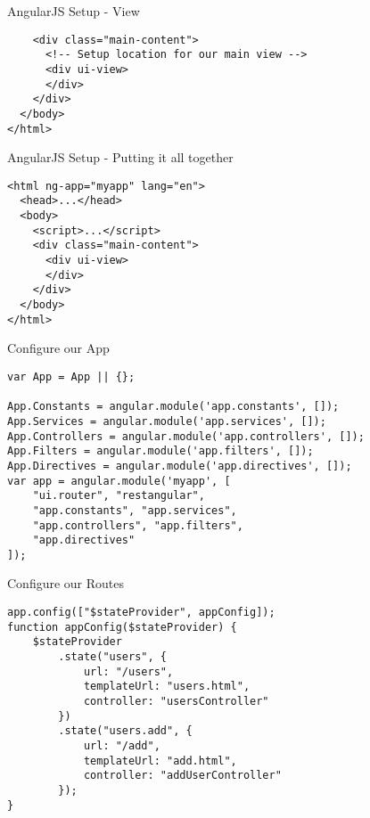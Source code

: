 \documentclass[presentation]{beamer}
\begin{document}
\begin{frame}[fragile,label=sec-1-6]{AngularJS Setup - View}
 \begin{verbatim}
    <div class="main-content">
      <!-- Setup location for our main view -->
      <div ui-view>
      </div>
    </div>
  </body>
</html>
\end{verbatim}
\end{frame}

\begin{frame}[fragile,label=sec-1-7]{AngularJS Setup - Putting it all together}
 \begin{verbatim}
<html ng-app="myapp" lang="en">
  <head>...</head>
  <body>
    <script>...</script>
    <div class="main-content">
      <div ui-view>
      </div>
    </div>
  </body>
</html>
\end{verbatim}
\end{frame}

\begin{frame}[fragile,label=sec-1-8]{Configure our App}
 \begin{verbatim}
var App = App || {};

App.Constants = angular.module('app.constants', []);
App.Services = angular.module('app.services', []);
App.Controllers = angular.module('app.controllers', []);
App.Filters = angular.module('app.filters', []);
App.Directives = angular.module('app.directives', []);
var app = angular.module('myapp', [
    "ui.router", "restangular",
    "app.constants", "app.services",
    "app.controllers", "app.filters",
    "app.directives"
]);
\end{verbatim}
\end{frame}

\begin{frame}[fragile,label=sec-1-9]{Configure our Routes}
 \begin{verbatim}
app.config(["$stateProvider", appConfig]);
function appConfig($stateProvider) {
    $stateProvider
        .state("users", {
            url: "/users",
            templateUrl: "users.html",
            controller: "usersController"
        })
        .state("users.add", {
            url: "/add",
            templateUrl: "add.html",
            controller: "addUserController"
        });
}
\end{verbatim}
\end{frame}
\end{document}
